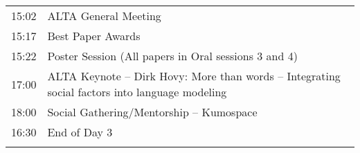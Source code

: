 \begin{longtable}{rl}
15:02 & ALTA General Meeting\\
15:17 & Best Paper Awards\\
15:22 & Poster Session (All papers in Oral sessions 3 and 4)\\
17:00 & ALTA Keynote – Dirk Hovy: More than words – Integrating social factors into language modeling\\
18:00 & Social Gathering/Mentorship – Kumospace\\
16:30 & End of Day 3 \\ \\

\end{longtable}

